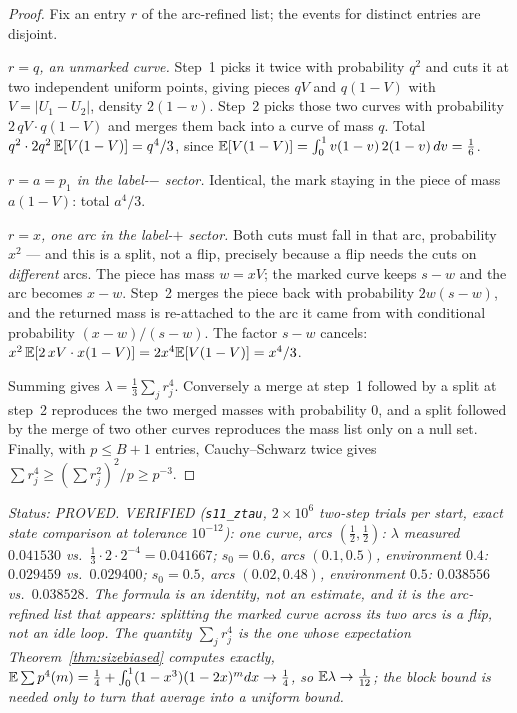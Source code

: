 \begin{proof}
Fix an entry $r$ of the arc-refined list; the events for distinct
entries are disjoint.

\emph{$r=q$, an unmarked curve.}  Step~1 picks it twice with
probability $q^2$ and cuts it at two independent uniform points,
giving pieces $qV$ and $q(1-V)$ with $V=|U_1-U_2|$, density $2(1-v)$.
Step~2 picks those two curves with probability $2\,qV\cdot q(1-V)$ and
merges them back into a curve of mass $q$.  Total
$q^2\cdot2q^2\,\mathbb{E}[V(1-V)]=q^4/3$, since
$\mathbb{E}[V(1-V)]=\int_0^1v(1-v)\,2(1-v)\,dv=\tfrac16$.

\emph{$r=a=p_1$ in the label-$-$ sector.}  Identical, the mark staying
in the piece of mass $a(1-V)$: total $a^4/3$.

\emph{$r=x$, one arc in the label-$+$ sector.}  Both cuts must fall in
that arc, probability $x^2$ --- and this is a split, not a flip,
precisely because a flip needs the cuts on \emph{different} arcs.  The
piece has mass $w=xV$; the marked curve keeps $s-w$ and the arc becomes
$x-w$.  Step~2 merges the piece back with probability $2w(s-w)$, and
the returned mass is re-attached to the arc it came from with
conditional probability $(x-w)/(s-w)$.  The factor $s-w$ cancels:
$x^2\,\mathbb{E}[2\,xV\cdot x(1-V)]=2x^4\mathbb{E}[V(1-V)]=x^4/3$.

Summing gives $\lambda=\tfrac13\sum_jr_j^4$.  Conversely a merge at
step~1 followed by a split at step~2 reproduces the two merged masses
with probability $0$, and a split followed by the merge of two other
curves reproduces the mass list only on a null set.  Finally, with
$p\le B+1$ entries, Cauchy--Schwarz twice gives
$\sum r_j^4\ge(\sum r_j^2)^2/p\ge p^{-3}$.
\end{proof}

\emph{Status: PROVED.  VERIFIED (\texttt{s11\_ztau}, $2\times10^6$
two-step trials per start, exact state comparison at tolerance
$10^{-12}$): one curve, arcs $(\tfrac12,\tfrac12)$: $\lambda$ measured
$0.041530$ vs.\ $\tfrac13\cdot2\cdot2^{-4}=0.041667$; $s_0=0.6$, arcs
$(0.1,0.5)$, environment $0.4$: $0.029459$ vs.\ $0.029400$;
$s_0=0.5$, arcs $(0.02,0.48)$, environment $0.5$: $0.038556$ vs.\
$0.038528$.  The formula is an identity, not an estimate, and it is the
\emph{arc-refined} list that appears: splitting the marked curve across
its two arcs is a flip, not an idle loop.  The quantity $\sum_jr_j^4$
is the one whose expectation Theorem~\ref{thm:sizebiased} computes
exactly, $\mathbb{E}\sum p^4(m)=\tfrac14+\int_0^1(1-x^3)(1-2x)^mdx\to\tfrac14$,
so $\mathbb{E}\lambda\to\tfrac1{12}$; the block bound is needed only to turn
that average into a uniform bound.}

